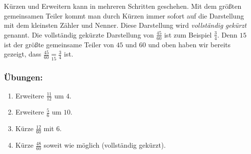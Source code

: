 Kürzen und Erweitern kann in mehreren Schritten geschehen. Mit dem größten gemeinsamen Teiler kommt man durch Kürzen immer sofort auf die Darstellung mit dem kleinsten Zähler und Nenner. Diese Darstellung wird \emph{vollständig gekürzt} genannt. Die vollständig gekürzte Darstellung von $\frac{45}{60}$ ist zum Beispiel $\frac{3}{4}$. Denn $15$ ist der größte gemeinsame Teiler von $45$ und $60$ und oben haben wir bereits gezeigt, dass $\frac{45}{60}\underset{15}{=}\frac{3}{4}$ ist.


\subsubsection*{Übungen:}\vspace{-1em}
\begin{enumerate}[label=\alph*)]
	\item Erweitere $\frac{11}{12}$ um $4$.
	\item Erweitere $\frac{5}{6}$ um $10$.
	\item Kürze $\frac{12}{60}$ mit $6$.
	\item Kürze $\frac{48}{60}$ soweit wie möglich (vollständig gekürzt).
\end{enumerate}